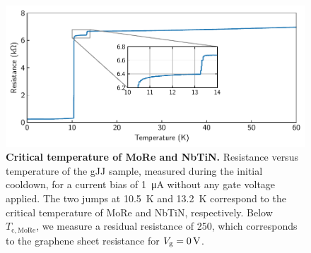 \documentclass[preprint,
  onecolumn,
  notitlepage,
  amsmath,amssymb,
  aip,
  apl,
]{revtex4-1}
\begin{document}
\begin{figure}[]
    \centering
    \includegraphics[width=.7\linewidth]{figs/si_cooldown_tc}
    \caption{{\bf Critical temperature of MoRe and NbTiN.}
        Resistance versus temperature of the gJJ sample, measured during the initial cooldown, for a current bias of \SI{1}{\micro A} without any gate voltage applied.
        The two jumps at \SI{10.5}{K} and \SI{13.2}{K} correspond to the critical temperature of MoRe and NbTiN, respectively.
        Below $T_\mathrm{c,MoRe}$, we measure a residual resistance of \SI{250}{\Omega}, which corresponds to the graphene sheet resistance for $V_{\rm g}=\SI{0}{V}$.}
    \label{fig:critical_temp}
\end{figure}

\end{document}
